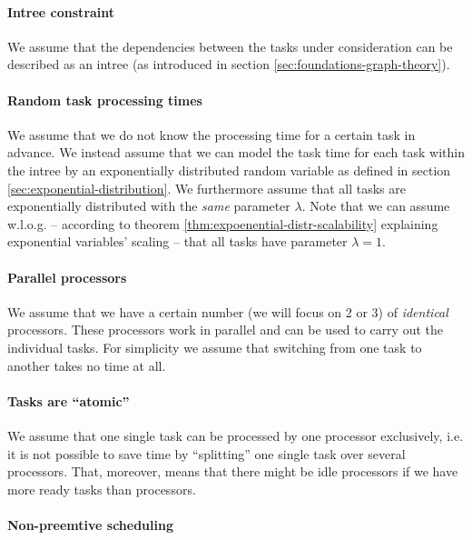 \paragraph{Intree constraint}

We assume that the dependencies between the tasks under consideration can be described as an intree (as introduced in  section \ref{sec:foundations-graph-theory}).

\paragraph{Random task processing times}

We assume that we do not know the processing time for a certain task in advance. We instead assume that we can model the task time for each task within the intree by an exponentially distributed random variable as defined in section \ref{sec:exponential-distribution}. We furthermore assume that all tasks are exponentially distributed with the \emph{same} parameter $\lambda$. Note that we can assume w.l.o.g. --  according to theorem \ref{thm:expoenential-distr-scalability} explaining exponential variables' scaling -- that all tasks have parameter $\lambda=1$.

\paragraph{Parallel processors}

We assume that we have a certain number (we will focus on 2 or 3) of \emph{identical} processors. These processors work in parallel and can be used to carry out the individual tasks. For simplicity we assume that switching from one task to another takes no time at all.

\paragraph{Tasks are ``atomic''}

We assume that one single task can be processed by one processor exclusively, i.e. it is not possible to save time by ``splitting'' one single task over several processors. That, moreover, means that there might be idle processors if we have more ready tasks than processors.

\paragraph{Non-preemtive scheduling}

